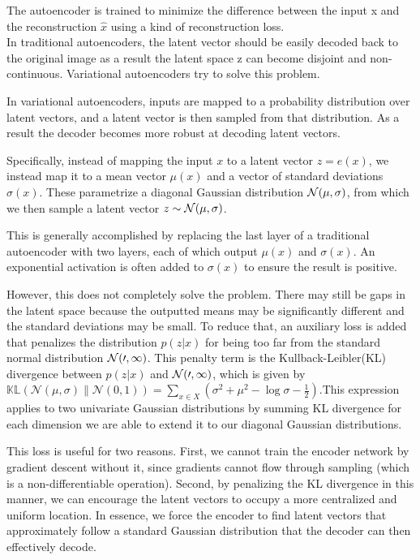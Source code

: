 The autoencoder is trained to minimize the difference between the input x and
the reconstruction $\hat{x}$ using a kind of reconstruction loss.\\ 

In traditional autoencoders, the latent vector should be easily decoded back to
the original image as a result the latent space z can become disjoint and
non-continuous. Variational autoencoders try to solve this problem.

In variational autoencoders, inputs are mapped to a probability distribution
over latent vectors, and a latent vector is then sampled from that
distribution. As a result the decoder becomes more robust at decoding latent
vectors.

Specifically, instead of mapping the input $x$ to a latent vector $z=e(x)$, 
we  instead map it to a mean vector $\mu(x)$ 
and a vector of standard deviations $\sigma(x)$. 
These parametrize a diagonal Gaussian distribution $\cal{N}(\mu, \sigma)$, 
from which we then sample a latent vector $z \sim \cal{N}(\mu, \sigma)$.


This is generally accomplished by replacing the last layer of a traditional
autoencoder with two layers, each of which output $\mu(x)$ and $\sigma(x)$. An
exponential activation is often added to $\sigma(x)$ to ensure the result is
positive.

However, this does not completely solve the problem. 
There may still be gaps in the latent space because the outputted means may 
be significantly different and the standard deviations may be small. 
To reduce that, an auxiliary loss is added that penalizes 
the distribution $p(z|x)$ for being too far from the standard normal distribution 
$\cal{N}(0,1)$. This penalty term is the 
Kullback-Leibler(KL) divergence between $p(z|x)$ and $\cal{N}(0,1)$, 
which is given by\(\mathbb{KL}\left( \mathcal{N}(\mu, \sigma) \parallel \mathcal{N}(0, 1) \right) = \sum_{x \in X} \left( \sigma^2 + \mu^2 - \log \sigma - \frac{1}{2} \right)\).This expression applies to two univariate Gaussian distributions by summing KL divergence for each dimension we are able to  extend it to our diagonal Gaussian distributions.

This loss is useful for two reasons. First, we cannot train the encoder network by gradient descent without it, since gradients cannot flow through sampling (which is a non-differentiable operation). Second, by penalizing the KL divergence in this manner, we can encourage the latent vectors to occupy a more centralized and uniform location. In essence, we force the encoder to find latent vectors that approximately follow a standard Gaussian distribution that the decoder can then effectively decode.

